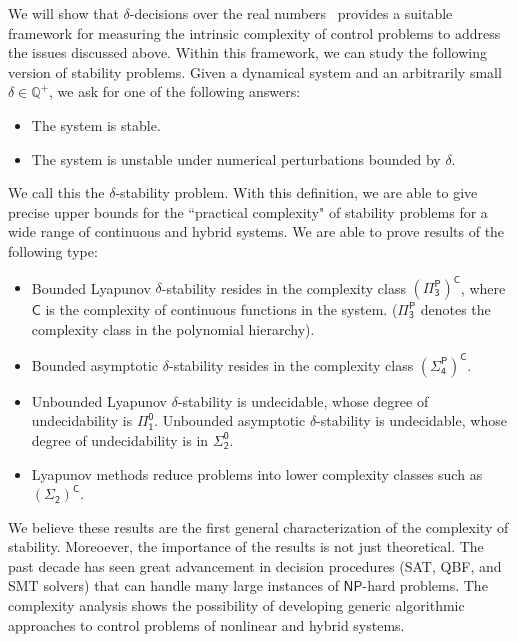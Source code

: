 \documentclass[10pt]{article}
\theoremstyle{plain}
\theoremstyle{definition}
\newcommand{\np}{\mathsf{NP}}
\begin{document}
We will show that $\delta$-decisions over the real numbers~\cite{DBLP:conf/lics/GaoAC12,DBLP:conf/cade/GaoAC12} provides a suitable framework for measuring the intrinsic complexity of control problems to address the issues discussed above. Within this framework, we can study the following version of stability problems. Given a dynamical system and an arbitrarily small $\delta\in \mathbb{Q}^+$, we ask for one of the following answers:
\begin{itemize}
\item The system is stable. 
\item The system is unstable under numerical perturbations bounded by $\delta$. 
\end{itemize}
We call this the $\delta$-stability problem. With this definition, we are able to give precise upper bounds for the ``practical complexity" of stability problems for a wide range of continuous and hybrid systems. We are able to prove results of the following type:
\begin{itemize}
\item Bounded Lyapunov $\delta$-stability resides in the complexity class $\mathsf{(\Pi^P_3)^C}$, where $\mathsf{C}$ is the complexity of continuous functions in the system. ($\mathsf{\Pi^P_3}$ denotes the complexity class in the polynomial hierarchy).
\item Bounded asymptotic $\delta$-stability resides in the complexity class $\mathsf{(\Sigma^P_4)^C}$. 
\item Unbounded Lyapunov $\delta$-stability is undecidable, whose degree of undecidability is $\mathsf{\Pi^0_1}$. Unbounded asymptotic $\delta$-stability is undecidable, whose degree of undecidability is in $\mathsf{\Sigma^0_2}$.
\item Lyapunov methods reduce problems into lower complexity classes such as $\mathsf{(\Sigma_2)^C}$.  
\end{itemize}
We believe these results are the first general characterization of the complexity of stability. Moreoever, the importance of the results is not just theoretical. The past decade has seen great advancement in decision procedures (SAT, QBF, and SMT solvers) that can handle many large instances of $\np$-hard problems. The complexity analysis shows the possibility of developing generic algorithmic approaches to control problems of nonlinear and hybrid systems.
\end{document}
